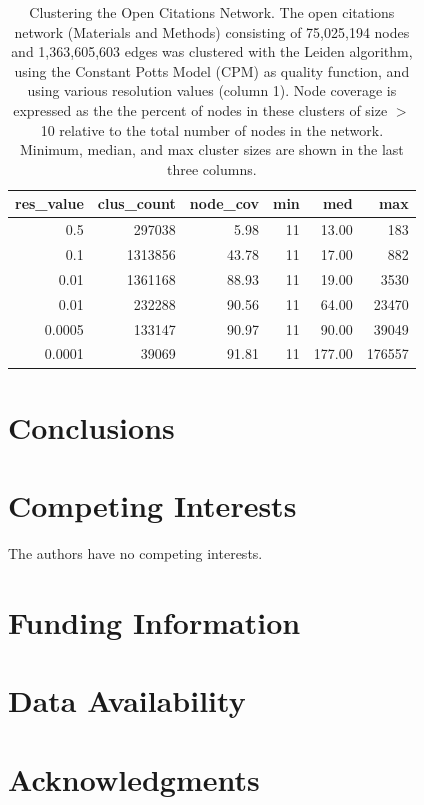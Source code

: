 \documentclass[12pt, oneside]{article}   	%
\begin{document}
\begin{table}[ht]
\centering
\begin{tabular}{rrrrrr}
  \hline
 res\_value & clus\_count & node\_cov & min & med & max \\ 
  \hline
0.5 & 297038 & 5.98 &  11 & 13.00 & 183 \\ 
0.1 & 1313856 & 43.78 &  11 & 17.00 & 882 \\ 
0.01 & 1361168 & 88.93 &  11 & 19.00 & 3530 \\ 
0.01 & 232288 & 90.56 &  11 & 64.00 & 23470 \\ 
0.0005 & 133147 & 90.97 &  11 & 90.00 & 39049 \\  
0.0001 & 39069 & 91.81 &  11 & 177.00 & 176557 \\ 
   \hline
\end{tabular}
\caption{Clustering the Open Citations Network. The open citations network (Materials and Methods) consisting of 75,025,194 nodes and 1,363,605,603 edges was clustered with the Leiden algorithm, using the Constant Potts Model (CPM) as quality function, and using various resolution values (column 1). Node coverage is expressed as the the percent of nodes in these clusters of size $>$ 10 relative to the total number of nodes in the network. Minimum, median, and max cluster sizes are shown in the last three columns.  }
\end{table}


		
\section{Conclusions}
	
\section*{Competing Interests} \vspace{3mm} The authors have no competing interests. 
	
\section*{Funding Information} 
	
\section*{Data Availability} 
	
\section*{Acknowledgments} 



\end{document}
